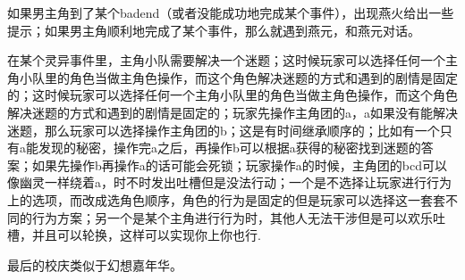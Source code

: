 如果男主角到了某个badend（或者没能成功地完成某个事件），出现燕火给出一些提示；如果男主角顺利地完成了某个事件，那么就遇到燕元，和燕元对话。

在某个灵异事件里，主角小队需要解决一个迷题；这时候玩家可以选择任何一个主角小队里的角色当做主角色操作，而这个角色解决迷题的方式和遇到的剧情是固定的；这时候玩家可以选择任何一个主角小队里的角色当做主角色操作，而这个角色解决迷题的方式和遇到的剧情是固定的；玩家先操作主角团的a，a如果没有能解决迷题，那么玩家可以选择操作主角团的b；这是有时间继承顺序的；比如有一个只有a能发现的秘密，操作完a之后，再操作b可以根据a获得的秘密找到迷题的答案；如果先操作b再操作a的话可能会死锁；玩家操作a的时候，主角团的bcd可以像幽灵一样绕着a，时不时发出吐槽但是没法行动；一个是不选择让玩家进行行为上的选项，而改成选角色顺序，角色的行为是固定的但是玩家可以选择这一套套不同的行为方案；另一个是某个主角进行行为时，其他人无法干涉但是可以欢乐吐槽，并且可以轮换，这样可以实现你上你也行.

最后的校庆类似于幻想嘉年华。

